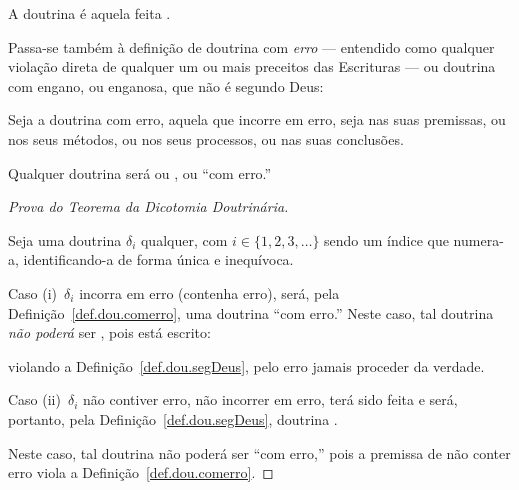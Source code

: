     \begin{DEF}
        \label{def.dou.segDeus}
        A doutrina  é aquela feita .
    \end{DEF}

    Passa-se também à definição de doutrina com \emph{erro} --- entendido como qualquer violação direta de qualquer um  ou  mais
    preceitos das Escrituras --- ou doutrina com engano, ou enganosa, que não é segundo Deus:

    \begin{DEF}
        \label{def.dou.comerro}
        Seja a doutrina com erro, aquela que incorre em erro, seja nas suas premissas, ou nos seus métodos,  ou  nos
        seus processos, ou nas suas conclusões.
    \end{DEF}

    \begin{THE}
        \label{the.dou.dicotomia}
        Qualquer doutrina será ou , ou ``com erro.''
    \end{THE}

    \begin{proof}[Prova do Teorema da Dicotomia Doutrinária]
        \label{pro.the.dicotomia}

        Seja uma doutrina $\delta_i$ qualquer, com $i \in \{1,  2,  3,  \ldots\}$  sendo  um  índice  que  numera-a,
        identificando-a de forma única e inequívoca.

        Caso (i)~$\delta_i$ incorra  em  erro  (contenha  erro),  será,  pela  Definição~\ref{def.dou.comerro},  uma
        doutrina ``com erro.'' Neste caso, tal doutrina \emph{não  poderá}  ser  ,  pois  está
        escrito:


        \noindent violando a Definição~\ref{def.dou.segDeus}, pelo erro jamais proceder da verdade.

        Caso (ii)~$\delta_i$ não contiver erro, não incorrer em erro, terá sido feita     e     será,     portanto,     pela
        Definição~\ref{def.dou.segDeus}, doutrina .

        Neste caso, tal doutrina não poderá  ser  ``com  erro,''  pois  a  premissa  de  não  conter  erro  viola  a
        Definição~\ref{def.dou.comerro}.

    \end{proof}

